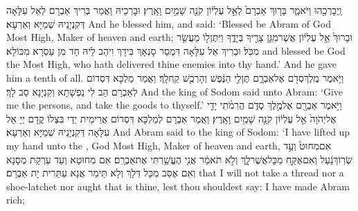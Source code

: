 {וַֽיְבָרְכֵ֖הוּ וַיֹּאמַ֑ר בָּר֤וּךְ אַבְרָם֙ לְאֵ֣ל עֶלְי֔וֹן קֹנֵ֖ה שָׁמַ֥יִם וָאָֽרֶץ׃}
{וּבָרְכֵיהּ וַאֲמַר בְּרִיךְ אַבְרָם לְאֵל עִלָּאָה דְּקִנְיָנֵיהּ שְׁמַיָּא וְאַרְעָא׃}
{And he blessed him, and said: ‘Blessed be Abram of God Most High, Maker of heaven and earth;}{}
{וּבָרוּךְ֙ אֵ֣ל עֶלְי֔וֹן אֲשֶׁר\maqqaf מִגֵּ֥ן צָרֶ֖יךָ בְּיָדֶ֑ךָ וַיִּתֶּן\maqqaf ל֥וֹ מַעֲשֵׂ֖ר מִכֹּֽל׃}
{וּבְרִיךְ אֵל עִלָּאָה דִּמְסַר סָנְאָךְ בִּידָךְ וִיהַב לֵיהּ חַד מִן עַסְרָא מִכּוֹלָא׃}
{and blessed be God the Most High, who hath delivered thine enemies into thy hand.’ And he gave him a tenth of all.}{}
{וַיֹּ֥אמֶר מֶֽלֶךְ\maqqaf סְדֹ֖ם אֶל\maqqaf אַבְרָ֑ם תֶּן\maqqaf לִ֣י הַנֶּ֔פֶשׁ וְהָרְכֻ֖שׁ קַֽח\maqqaf לָֽךְ׃}
{וַאֲמַר מַלְכָּא דִּסְדוֹם לְאַבְרָם הַב לִי נַפְשָׁתָא וְקִנְיָנָא סַב לָךְ׃}
{And the king of Sodom said unto Abram: ‘Give me the persons, and take the goods to thyself.’}{}
{וַיֹּ֥אמֶר אַבְרָ֖ם אֶל\maqqaf מֶ֣לֶךְ סְדֹ֑ם הֲרִמֹ֨תִי יָדִ֤י אֶל\maqqaf יְהֹוָה֙ אֵ֣ל עֶלְי֔וֹן קֹנֵ֖ה שָׁמַ֥יִם וָאָֽרֶץ׃}
{וַאֲמַר אַבְרָם לְמַלְכָּא דִּסְדוֹם אֲרֵימִית יְדַי בִּצְלוֹ קֳדָם יְיָ אֵל עִלָּאָה דְּקִנְיָנֵיהּ שְׁמַיָּא וְאַרְעָא׃}
{And Abram said to the king of Sodom: ‘I have lifted up my hand unto the \lord, God Most High, Maker of heaven and earth,}{}
{אִם\maqqaf מִחוּט֙ וְעַ֣ד שְׂרֽוֹךְ\maqqaf נַ֔עַל וְאִם\maqqaf אֶקַּ֖ח מִכׇּל\maqqaf אֲשֶׁר\maqqaf לָ֑ךְ וְלֹ֣א תֹאמַ֔ר אֲנִ֖י הֶעֱשַׁ֥רְתִּי אֶת\maqqaf אַבְרָֽם׃}
{אִם מִחוּטָא וְעַד עַרְקַת מְסָנָא וְאִם אֶסַּב מִכָּל דְּלָךְ וְלָא תֵּימַר אֲנָא עַתַּרִית יָת אַבְרָם׃}
{that I will not take a thread nor a shoe-latchet nor aught that is thine, lest thou shouldest say: I have made Abram rich;}{}
